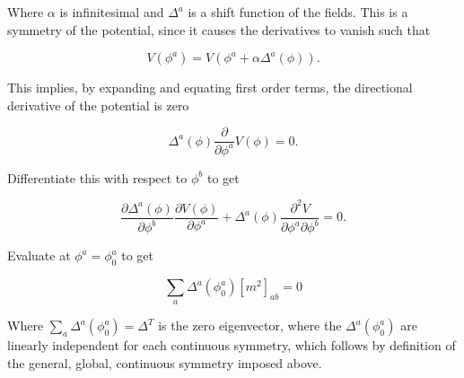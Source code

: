 \noindent Where $\alpha$ is infinitesimal and $\Delta^a$ is a shift function of the fields. This is a symmetry of the potential, since it causes the derivatives to vanish such that

\begin{equation}
V(\phi^a) = V(\phi^a + \alpha \Delta^a (\phi)).
\end{equation}

\noindent This implies, by expanding and equating first order terms, the directional derivative of the potential is zero

\begin{equation}
\Delta^a (\phi) \frac{\partial}{\partial \phi^a} V(\phi) = 0.
\end{equation}

\noindent Differentiate this with respect to $\phi^b$ to get

\begin{equation}
\frac{\partial \Delta^a (\phi)}{\partial \phi^b} \frac{\partial V(\phi)}{\partial \phi^a} + \Delta^a (\phi) \frac{\partial^2 V}{\partial \phi^a \partial \phi^b} = 0.
\end{equation}

\noindent Evaluate at $\phi^a = \phi_0^a$ to get

\begin{equation}
\sum_a \Delta^a (\phi_0^a) [m^2]_{ab} = 0
\end{equation}

\noindent Where $\sum_a \Delta^a (\phi_0^a) = \Delta^T$ is the zero eigenvector, where the $\Delta^a (\phi^a_0)$ are linearly independent for each continuous symmetry, which follows by definition of the general, global, continuous symmetry imposed above.